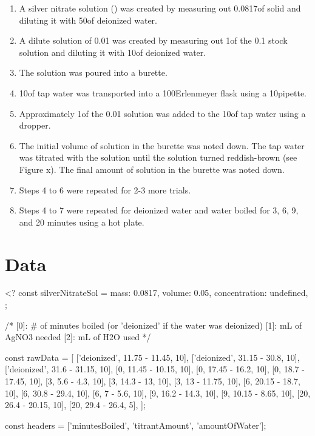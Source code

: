 \documentclass[11pt]{article}
\begin{document}
\begin{enumerate}
	\item A silver nitrate solution () was created by measuring out 0.0817\g of solid  and diluting it with 50\ml of deionized water.
	\item A dilute solution of 0.01\mpl {} was created by measuring out 1\ml of the 0.1\mpl {} stock solution and diluting it with 10\ml of deionized water.
	\item The  solution was poured into a burette.
	\item 10\ml of tap water was transported into a 100\ml Erlenmeyer flask using a 10\ml pipette.
	\item Approximately 1\ml of the 0.01\mpl {} solution was added to the 10\ml of tap water using a dropper.
	\item The initial volume of  solution in the burette was noted down. The tap water was titrated with the  solution until the solution turned reddish-brown (see Figure x). The final amount of solution in the burette was noted down.
	\item Steps 4 to 6 were repeated for 2-3 more trials.
	\item Steps 4 to 7 were repeated for deionized water and water boiled for 3, 6, 9, and 20 minutes using a hot plate.
\end{enumerate}

\section{Data}

<?
const silverNitrateSol = {
	mass: 0.0817,
	volume: 0.05,
	concentration: undefined,
};

/*
[0]: # of minutes boiled (or 'deionized' if the water was deionized)
[1]: mL of AgNO3 needed
[2]: mL of H2O used
*/

const rawData = [
	['deionized', 11.75 - 11.45, 10],
	['deionized', 31.15 - 30.8, 10],
	['deionized', 31.6 - 31.15, 10],
	[0, 11.45 - 10.15, 10],
	[0, 17.45 - 16.2, 10],
	[0, 18.7 - 17.45, 10],
	[3, 5.6 - 4.3, 10],
	[3, 14.3 - 13, 10],
	[3, 13 - 11.75, 10],
	[6, 20.15 - 18.7, 10],
	[6, 30.8 - 29.4, 10],
	[6, 7 - 5.6, 10],
	[9, 16.2 - 14.3, 10],
	[9, 10.15 - 8.65, 10],
	[20, 26.4 - 20.15, 10],
	[20, 29.4 - 26.4, 5],
];

const headers = ['minutesBoiled', 'titrantAmount', 'amountOfWater'];
\end{document}
